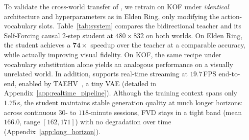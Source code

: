 To validate the cross-world transfer of \methodname, we retrain on KOF under \emph{identical} architecture and 
hyperparameters as in Elden Ring, only modifying the action-vocabulary slots. 
Table~\ref{tab:system} compares the bidirectional teacher and its Self-Forcing causal $2$-step 
student at $480{\times}832$ on both worlds.
On Elden Ring, the student achieves a $\mathbf{74\times}$ speedup over the teacher at a comparable accuracy, 
while actually 
improving visual fidelity. 
On KOF, the same recipe under vocabulary substitution alone yields an 
analogous performance on a visually unrelated world. 
In addition, \methodname{} supports real-time streaming at $19.7$\,FPS end-to-end,
enabled by TAEHV~\citep{BoerBohan2025TAEHV}, a tiny VAE
(detailed in Appendix~\ref{app:realtime_pipeline}).
Although the training context spans only $1.75$\,s, 
the student maintains stable generation quality at much longer horizons: 
across continuous $30$- to $118$-minute sessions, 
FVD stays in a tight band (mean $166.0$, range $[162, 171]$) with no degradation 
over time (Appendix~\ref{app:long_horizon}). 


